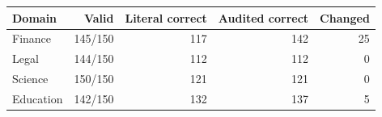 \begin{tabular}{lrrrr}
\toprule
Domain & Valid & Literal correct & Audited correct & Changed \\
\midrule
Finance & 145/150 & 117 & 142 & 25 \\
Legal & 144/150 & 112 & 112 & 0 \\
Science & 150/150 & 121 & 121 & 0 \\
Education & 142/150 & 132 & 137 & 5 \\
\bottomrule
\end{tabular}
